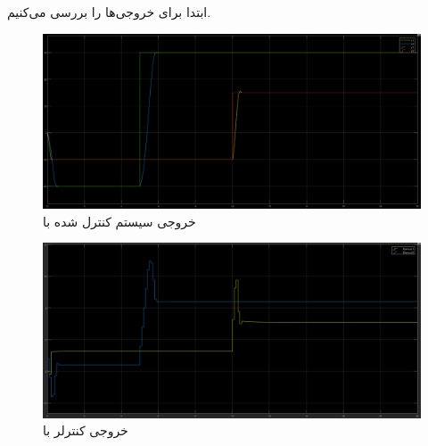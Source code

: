 \documentclass[14pt, a4paper]{extarticle}
\begin{document}
\subsubsection{}
ابتدا برای 
خروجی‌ها را بررسی می‌کنیم.\\
\begin{figure}[h!]
	\centering
	\includegraphics[scale = 0.3]{Q2_sim_result_ph20.png}
	\caption{خروجی سیستم کنترل شده با
		}
\end{figure}
\begin{figure}[h!]
	\centering
	\includegraphics[scale = 0.3]{Q2_sim_control_ph20.png}
	\caption{خروجی کنترلر با
		}
\end{figure}
\end{document}
